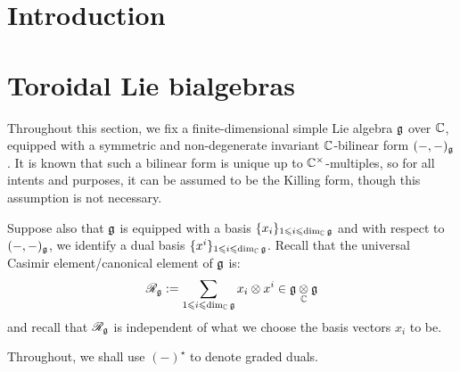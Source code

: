 

\setcounter{section}{-1}





    \title{}
    
    \author{Dat Minh Ha}
    \maketitle
    
    \begin{abstract}
    
    \end{abstract}
    
    {
    \hypersetup{} 
    \tableofcontents %
    \listoftodos
    }

    \section{Introduction}

    \section{Toroidal Lie bialgebras}
        \begin{convention} \label{conv: a_fixed_finite_dimensional_simple_lie_algebra}
            Throughout this section, we fix a finite-dimensional simple Lie algebra $\mathfrak{g}$ over $\mathbb{C}$, equipped with a symmetric and non-degenerate invariant $\mathbb{C}$-bilinear form $(-, -)_{\mathfrak{g}}$. It is known that such a bilinear form is unique up to $\bbC^{\x}$-multiples, so for all intents and purposes, it can be assumed to be the Killing form, though this assumption is not necessary. 

            Suppose also that $\mathfrak{g}$ is equipped with a basis $\{x_i\}_{1 \leqslant i \leqslant \dim_{\mathbb{C}} \mathfrak{g}}$ and with respect to $(-, -)_{\mathfrak{g}}$, we identify a dual basis $\{x^i\}_{1 \leqslant i \leqslant \dim_{\mathbb{C}} \mathfrak{g}}$. Recall that the universal Casimir element/canonical element of $\mathfrak{g}$ is:
                $$\scrR_{\g} := \sum_{1 \leq i \leq \dim_{\bbC} \g} x_i \tensor x^i \in \g \tensor_{\bbC} \g$$
            and recall that $\mathscr{R}_{\mathfrak{g}}$ is independent of what we choose the basis vectors $x_i$ to be.
        \end{convention}

        \begin{convention}
            Throughout, we shall use $(-)^{\star}$ to denote graded duals. 
        \end{convention}

